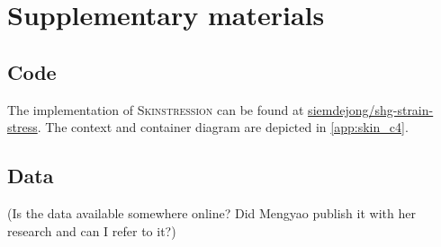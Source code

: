 \section{Supplementary materials}
\subsection{Code}
The implementation of \textsc{Skinstression} can be found at \href{https://github.io/siemdejong/shg-strain-stress}{ siemdejong/shg-strain-stress}.
The context and container diagram are depicted in \cref{app:skin_c4}.

\subsection{Data}
(Is the data available somewhere online?
Did Mengyao publish it with her research and can I refer to it?)